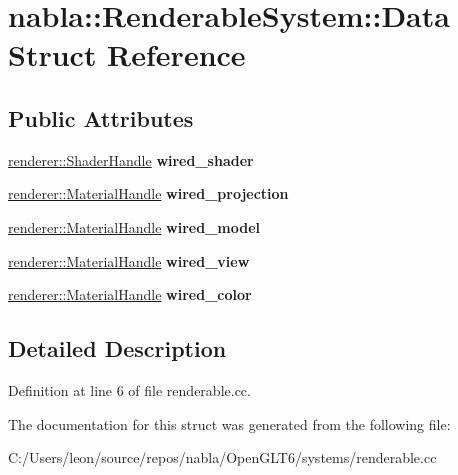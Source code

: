 \hypertarget{structnabla_1_1_renderable_system_1_1_data}{}\section{nabla\+::Renderable\+System\+::Data Struct Reference}
\label{structnabla_1_1_renderable_system_1_1_data}
\subsection*{Public Attributes}
\begin{DoxyCompactItemize}
\item 
\mbox{\label{structnabla_1_1_renderable_system_1_1_data_aa63d0bfa5a71475a55cb5ab5b00145f7}} 
\mbox{\hyperlink{classnabla_1_1renderer_1_1_handle}{renderer\+::\+Shader\+Handle}} {\bfseries wired\+\_\+shader}
\item 
\mbox{\label{structnabla_1_1_renderable_system_1_1_data_a0520a3eab589e144761eee7221497214}} 
\mbox{\hyperlink{classnabla_1_1renderer_1_1_handle}{renderer\+::\+Material\+Handle}} {\bfseries wired\+\_\+projection}
\item 
\mbox{\label{structnabla_1_1_renderable_system_1_1_data_a4a4dd5038375fef75f6086bafeba40f1}} 
\mbox{\hyperlink{classnabla_1_1renderer_1_1_handle}{renderer\+::\+Material\+Handle}} {\bfseries wired\+\_\+model}
\item 
\mbox{\label{structnabla_1_1_renderable_system_1_1_data_a7fc56eb6809edf0aaf676da103cd30f2}} 
\mbox{\hyperlink{classnabla_1_1renderer_1_1_handle}{renderer\+::\+Material\+Handle}} {\bfseries wired\+\_\+view}
\item 
\mbox{\label{structnabla_1_1_renderable_system_1_1_data_a1111cfe5a4902358a7870f250c048131}} 
\mbox{\hyperlink{classnabla_1_1renderer_1_1_handle}{renderer\+::\+Material\+Handle}} {\bfseries wired\+\_\+color}
\end{DoxyCompactItemize}


\subsection{Detailed Description}


Definition at line 6 of file renderable.\+cc.



The documentation for this struct was generated from the following file\+:\begin{DoxyCompactItemize}
\item 
C\+:/\+Users/leon/source/repos/nabla/\+Open\+G\+L\+T6/systems/renderable.\+cc\end{DoxyCompactItemize}
